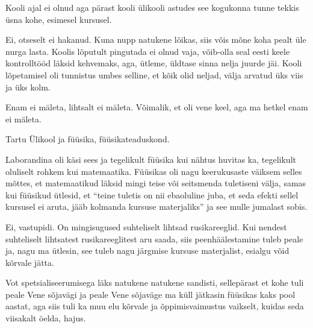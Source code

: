 
Kooli ajal ei olnud aga pärast kooli ülikooli astudes see kogukonna tunne 
tekkis üsna kohe, esimesel kursusel.


Ei, otseselt ei hakanud. Kuna nupp natukene lõikas, siis võis mõne koha pealt 
üle nurga lasta. Koolis lõputult pingutada ei olnud vaja, võib-olla seal eesti 
keele kontrolltööd läksid kehvemaks, aga, ütleme, üldtase sinna nelja juurde 
jäi. Kooli lõpetamisel oli tunnistus umbes selline, et kõik olid neljad, välja 
arvatud üks viis ja üks kolm. 


Enam ei mäleta, lihtsalt ei mäleta. Võimalik, et oli vene keel, aga ma hetkel 
enam ei mäleta.


Tartu Ülikool ja füüsika, füüsikateaduskond.


Laborandina oli käsi sees ja tegelikult füüsika kui nähtus huvitas ka, 
tegelikult oluliselt rohkem kui matemaatika. Füüsikas oli nagu keerukusaste 
väiksem selles mõttes, et matemaatikud läksid mingi teise või seitsmenda 
tuletiseni välja, samas kui füüsikud ütlesid, et \enquote{teine tuletis on nii 
ebaoluline juba, et seda efekti sellel kursusel ei aruta, jääb kolmanda kursuse 
materjaliks} ja see mulle jumalast sobis.


Ei, vastupidi. On mingisugused suhteliselt lihtsad rusikareeglid. Kui nendest 
suhteliselt lihtsatest rusikareeglitest aru saada, siis peenhäälestamine  tuleb 
peale ja, nagu ma ütlesin, see tuleb nagu järgmise kursuse materjalist,  
esialgu võid kõrvale jätta.


Vot spetsialiseerumisega läks natukene natukene sandisti, sellepärast et kohe 
tuli peale Vene sõjavägi ja peale Vene sõjaväge ma küll  jätkasin füüsikas kaks 
pool aastat, aga siis tuli ka muu elu kõrvale ja õppimisvaimustus vaikselt, 
kuidas seda viisakalt öelda, hajus.

